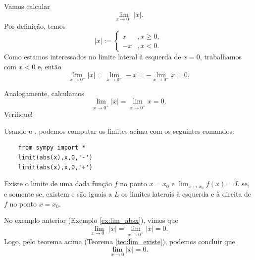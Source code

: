 \begin{exer}\label{ex:lim_absx}
  Vamos calcular
  \begin{equation}
    \lim_{x\to 0^-} |x|.
  \end{equation}
  Por definição, temos
  \begin{equation}
    |x| := \left\{
      \begin{array}{ll}
        x &, x\geq 0,\\
        -x &, x< 0.
      \end{array}
    \right.
  \end{equation}
  Como estamos interessados no limite lateral à esquerda de $x=0$, trabalhamos com $x<0$ e, então
  \begin{equation}
    \lim_{x\to 0^-} |x| = \lim_{x\to 0^-} -x = -\lim_{x\to 0^-} x = 0.
  \end{equation}
  
  Analogamente, calculamos
  \begin{equation}
    \lim_{x\to 0^+} |x| = \lim_{x\to 0^+} x = 0.
  \end{equation}
  Verifique!

  \ifispython
  Usando o {\sympy}, podemos computar os limites acima com os seguintes comandos:
  \begin{lstlisting}
    from sympy import *
    limit(abs(x),x,0,'-')
    limit(abs(x),x,0,'+')
  \end{lstlisting}
  \fi
\end{exer}

\begin{teo}\label{teo:lim_existe}
  Existe o limite de uma dada função $f$ no ponto $x=x_0$ e $\lim_{x\to x_0} f(x) = L$ se, e somente se, existem e são iguais a $L$ os limites laterais à esquerda e à direita de $f$ no ponto $x=x_0$.
\end{teo}

\begin{exer}
  No exemplo anterior (Exemplo \ref{ex:lim_absx}), vimos que
  \begin{equation}
    \lim_{x\to 0^-} |x| = \lim_{x\to 0^+} |x| = 0.
  \end{equation}
  Logo, pelo teorema acima (Teorema \ref{teo:lim_existe}), podemos concluir que
  \begin{equation}
    \lim_{x\to 0} |x| = 0.
  \end{equation}
\end{exer}

